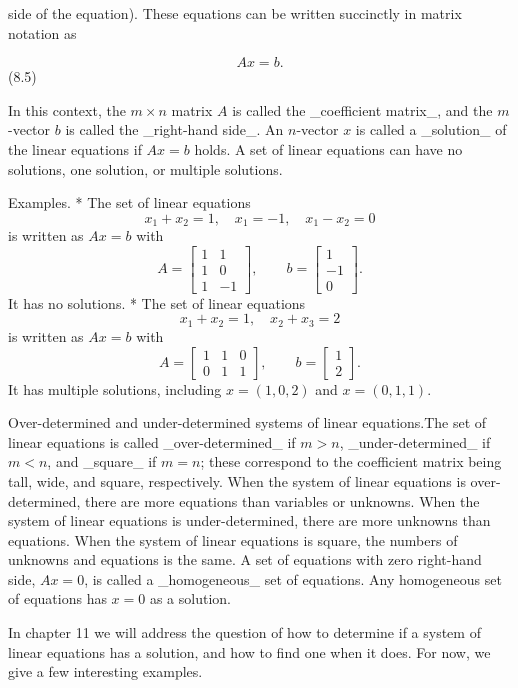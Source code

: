 side of the equation). These equations can be written succinctly in matrix notation as

\[Ax=b.\] (8.5)

In this context, the \(m\times n\) matrix \(A\) is called the _coefficient matrix_, and the \(m\)-vector \(b\) is called the _right-hand side_. An \(n\)-vector \(x\) is called a _solution_ of the linear equations if \(Ax=b\) holds. A set of linear equations can have no solutions, one solution, or multiple solutions.

Examples.
* The set of linear equations \[x_{1}+x_{2}=1,\quad x_{1}=-1,\quad x_{1}-x_{2}=0\] is written as \(Ax=b\) with \[A=\left[\begin{array}{cc}1&1\\ 1&0\\ 1&-1\end{array}\right],\qquad b=\left[\begin{array}{c}1\\ -1\\ 0\end{array}\right].\] It has no solutions.
* The set of linear equations \[x_{1}+x_{2}=1,\quad x_{2}+x_{3}=2\] is written as \(Ax=b\) with \[A=\left[\begin{array}{cc}1&1&0\\ 0&1&1\end{array}\right],\qquad b=\left[\begin{array}{c}1\\ 2\end{array}\right].\] It has multiple solutions, including \(x=(1,0,2)\) and \(x=(0,1,1)\).

Over-determined and under-determined systems of linear equations.The set of linear equations is called _over-determined_ if \(m>n\), _under-determined_ if \(m<n\), and _square_ if \(m=n\); these correspond to the coefficient matrix being tall, wide, and square, respectively. When the system of linear equations is over-determined, there are more equations than variables or unknowns. When the system of linear equations is under-determined, there are more unknowns than equations. When the system of linear equations is square, the numbers of unknowns and equations is the same. A set of equations with zero right-hand side, \(Ax=0\), is called a _homogeneous_ set of equations. Any homogeneous set of equations has \(x=0\) as a solution.

In chapter 11 we will address the question of how to determine if a system of linear equations has a solution, and how to find one when it does. For now, we give a few interesting examples.

 